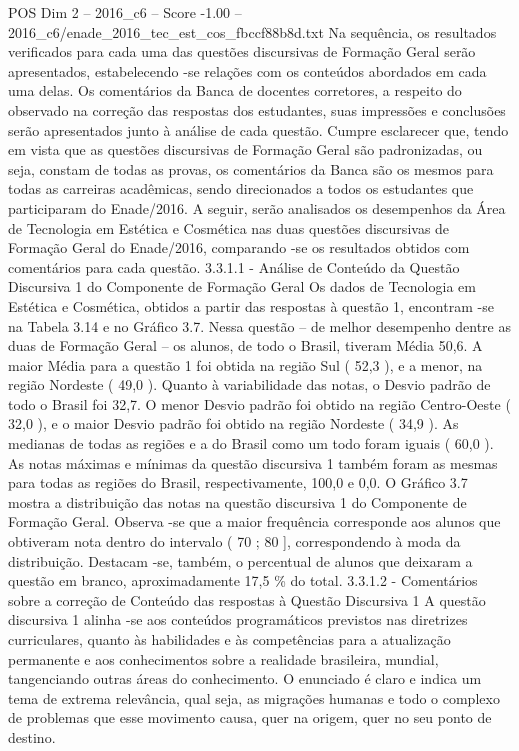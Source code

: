 \begin{textsample}{POS Dim 2 – 2016\_c6 – Score -1.00 – 2016\_c6/enade\_2016\_tec\_est\_cos\_fbccf88b8d.txt}
Na sequência, os resultados verificados para cada uma das questões discursivas de Formação Geral serão apresentados, estabelecendo -se relações com os conteúdos abordados em cada uma delas.
Os comentários da Banca de docentes corretores, a respeito do observado na correção das respostas dos estudantes, suas impressões e conclusões serão apresentados junto à análise de cada questão.
Cumpre esclarecer que, tendo em vista que as questões discursivas de Formação Geral são padronizadas, ou seja, constam de todas as provas, os comentários da Banca são os mesmos para todas as carreiras acadêmicas, sendo direcionados a todos os estudantes que participaram do Enade/2016.
A seguir, serão analisados os desempenhos da Área de Tecnologia em Estética e Cosmética nas duas questões discursivas de Formação Geral do Enade/2016, comparando -se os resultados obtidos com comentários para cada questão. 3.3.1.1 - Análise de Conteúdo da Questão Discursiva 1 do Componente de Formação Geral Os dados de Tecnologia em Estética e Cosmética, obtidos a partir das respostas à questão 1, encontram -se na Tabela 3.14 e no Gráfico 3.7.
Nessa questão – de melhor desempenho dentre as duas de Formação Geral – os alunos, de todo o Brasil, tiveram Média 50,6.
A maior Média para a questão 1 foi obtida na região Sul ( 52,3 ), e a menor, na região Nordeste ( 49,0 ).
Quanto à variabilidade das notas, o Desvio padrão de todo o Brasil foi 32,7.
O menor Desvio padrão foi obtido na região Centro-Oeste ( 32,0 ), e o maior Desvio padrão foi obtido na região Nordeste ( 34,9 ).
As medianas de todas as regiões e a do Brasil como um todo foram iguais ( 60,0 ).
As notas máximas e mínimas da questão discursiva 1 também foram as mesmas para todas as regiões do Brasil, respectivamente, 100,0 e 0,0.
O Gráfico 3.7 mostra a distribuição das notas na questão discursiva 1 do Componente de Formação Geral.
Observa -se que a maior frequência corresponde aos alunos que obtiveram nota dentro do intervalo ( 70 ; 80 ], correspondendo à moda da distribuição.
Destacam -se, também, o percentual de alunos que deixaram a questão em branco, aproximadamente 17,5 \% do total. 3.3.1.2 - Comentários sobre a correção de Conteúdo das respostas à Questão Discursiva 1 A questão discursiva 1 alinha -se aos conteúdos programáticos previstos nas diretrizes curriculares, quanto às habilidades e às competências para a atualização permanente e aos conhecimentos sobre a realidade brasileira, mundial, tangenciando outras áreas do conhecimento.
O enunciado é claro e indica um tema de extrema relevância, qual seja, as migrações humanas e todo o complexo de problemas que esse movimento causa, quer na origem, quer no seu ponto de destino.

\end{textsample}
